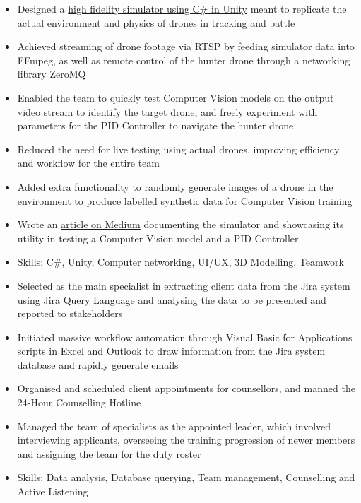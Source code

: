 \documentclass{cv}
\begin{document}
\begin{subsections}
    \subtitle{Command, Control and Communications Development, Defence Science and Technology Agency}
    \begin{itemize}
        \item Designed a \href{https://github.com/thedylone/unity-drone-simulator}{high fidelity simulator using C\# in Unity} meant to replicate the actual environment and physics of drones in tracking and battle
        \item Achieved streaming of drone footage via RTSP by feeding simulator data into FFmpeg, as well as remote control of the hunter drone through a networking library ZeroMQ
        \item Enabled the team to quickly test Computer Vision models on the output video stream to identify the target drone, and freely experiment with parameters for the PID Controller to navigate the hunter drone
        \item Reduced the need for live testing using actual drones, improving efficiency and workflow for the entire team
        \item Added extra functionality to randomly generate images of a drone in the environment to produce labelled synthetic data for Computer Vision training
        \item Wrote an \href{https://medium.com/d-classified/unity-as-a-testbed-for-autonomy-development-1e326323c68d}{article on Medium} documenting the simulator and showcasing its utility in testing a Computer Vision model and a PID Controller
        \item Skills: C\#, Unity, Computer networking, UI/UX, 3D Modelling, Teamwork
    \end{itemize}

    \subtitle{SAF Counselling Centre}
    \begin{itemize}
        \item Selected as the main specialist in extracting client data from the Jira system using Jira Query Language and analysing the data to be presented and reported to stakeholders
        \item Initiated massive workflow automation through Visual Basic for Applications scripts in Excel and Outlook to draw information from the Jira system database and rapidly generate emails
        \item Organised and scheduled client appointments for counsellors, and manned the 24-Hour Counselling Hotline
        \item Managed the team of specialists as the appointed leader, which involved interviewing applicants, overseeing the training progression of newer members and assigning the team for the duty roster
        \item Skills: Data analysis, Database querying, Team management, Counselling and Active Listening
    \end{itemize}
\end{subsections}
\end{document}
